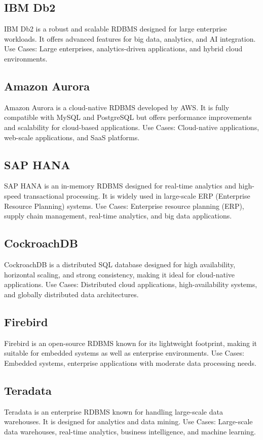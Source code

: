 \documentclass[openany]{book} %
\begin{document}
\subsection{IBM Db2}
IBM Db2 is a robust and scalable RDBMS designed for large enterprise workloads. It offers advanced features for big data, analytics, and AI integration.
Use Cases: Large enterprises, analytics-driven applications, and hybrid cloud environments.
\subsection{Amazon Aurora}
Amazon Aurora is a cloud-native RDBMS developed by AWS. It is fully compatible with MySQL and PostgreSQL but offers performance improvements and scalability for cloud-based applications.
Use Cases: Cloud-native applications, web-scale applications, and SaaS platforms.
\subsection{SAP HANA}
SAP HANA is an in-memory RDBMS designed for real-time analytics and high-speed transactional processing. It is widely used in large-scale ERP (Enterprise Resource Planning) systems.
Use Cases: Enterprise resource planning (ERP), supply chain management, real-time analytics, and big data applications.
\subsection{CockroachDB}
CockroachDB is a distributed SQL database designed for high availability, horizontal scaling, and strong consistency, making it ideal for cloud-native applications.
Use Cases: Distributed cloud applications, high-availability systems, and globally distributed data architectures.
\subsection{Firebird}
Firebird is an open-source RDBMS known for its lightweight footprint, making it suitable for embedded systems as well as enterprise environments.
Use Cases: Embedded systems, enterprise applications with moderate data processing needs.
\subsection{Teradata}
Teradata is an enterprise RDBMS known for handling large-scale data warehouses. It is designed for analytics and data mining.
Use Cases: Large-scale data warehouses, real-time analytics, business intelligence, and machine learning.
\end{document}
